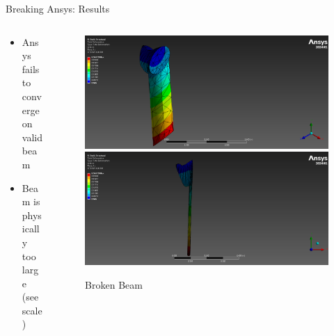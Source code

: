 \documentclass[11pt]{beamer}
\begin{document}
    \begin{frame}{Breaking Ansys: Results}
        \begin{columns}[T]
            \begin{column}{0.65\textwidth}
                \vspace{10pt}
                \begin{itemize} 
                    \item Ansys fails to converge on valid beam
                    \item Beam is physically too large (see scale)
                \end{itemize} 
            \end{column}
            \begin{column}{0.5\textwidth}
                \begin{figure}[H]
                    \centering
                    \includegraphics[scale=0.13]{figs/Broken_5.81E-3_All/iso_cropped.png}
                    \includegraphics[scale=0.13]{figs/Broken_5.81E-3_All/z-axis_cropped.png}
                    \caption{Broken Beam}
                \end{figure}
            \end{column}
        \end{columns}
    \end{frame}
\end{document}
